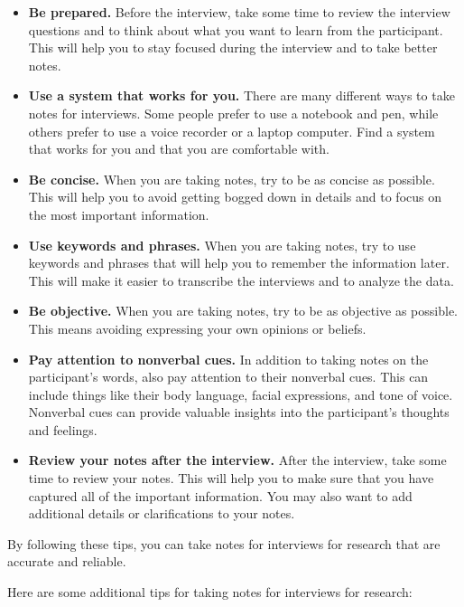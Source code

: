 \documentclass[
  b5paper]{book}
\begin{document}
\begin{itemize}
\item
  \textbf{Be prepared.} Before the interview, take some time to review the interview questions and to think about what you want to learn from the participant. This will help you to stay focused during the interview and to take better notes.
\item
  \textbf{Use a system that works for you.} There are many different ways to take notes for interviews. Some people prefer to use a notebook and pen, while others prefer to use a voice recorder or a laptop computer. Find a system that works for you and that you are comfortable with.
\item
  \textbf{Be concise.} When you are taking notes, try to be as concise as possible. This will help you to avoid getting bogged down in details and to focus on the most important information.
\item
  \textbf{Use keywords and phrases.} When you are taking notes, try to use keywords and phrases that will help you to remember the information later. This will make it easier to transcribe the interviews and to analyze the data.
\item
  \textbf{Be objective.} When you are taking notes, try to be as objective as possible. This means avoiding expressing your own opinions or beliefs.
\item
  \textbf{Pay attention to nonverbal cues.} In addition to taking notes on the participant's words, also pay attention to their nonverbal cues. This can include things like their body language, facial expressions, and tone of voice. Nonverbal cues can provide valuable insights into the participant's thoughts and feelings.
\item
  \textbf{Review your notes after the interview.} After the interview, take some time to review your notes. This will help you to make sure that you have captured all of the important information. You may also want to add additional details or clarifications to your notes.
\end{itemize}

By following these tips, you can take notes for interviews for research that are accurate and reliable.

Here are some additional tips for taking notes for interviews for research:
\end{document}
